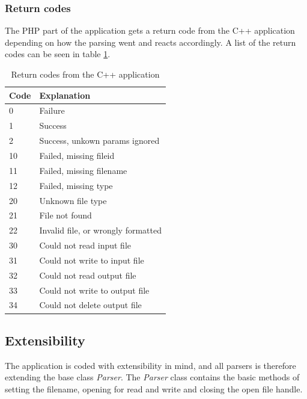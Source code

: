 \subsubsection{Return codes}
The PHP part of the application gets a return code from the C++ application depending on how the parsing went and reacts accordingly. A list of the return codes can be seen in table \ref{tab:cppReturnCodes}.
\begin{table}[htbp]
\centering
\begin{tabular}{|l|l|}
\hline
\textbf{Code} & \textbf{Explanation}\\
\hline
0 & Failure\\
\hline
1 & Success\\
\hline
2 & Success, unkown params ignored\\
\hline
10 & Failed, missing fileid\\
\hline
11 & Failed, missing filename\\
\hline
12 & Failed, missing type\\
\hline
20 & Unknown file type\\
\hline
21 & File not found\\
\hline
22 & Invalid file, or wrongly formatted\\
\hline
30 & Could not read input file\\
\hline
31 & Could not write to input file\\
\hline
32 & Could not read output file\\
\hline
33 & Could not write to output file\\
\hline
34 & Could not delete output file\\
\hline
\end{tabular}
\caption{Return codes from the C++ application}
\label{tab:cppReturnCodes}
\end{table}



\subsection{Extensibility}
The application is coded with extensibility in mind, and all parsers is therefore extending the base class \emph{Parser}.
The \emph{Parser} class contains the basic methods of setting the filename, opening for read and write and closing the open file handle.

